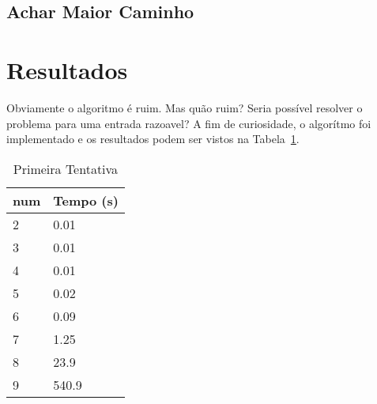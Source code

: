 \documentclass[12pt]{article}
\begin{document}
\subsection{Achar Maior Caminho}\label{sec:algoritmos:achar-maior-caminho}

\section{Resultados}\label{sec:resultados}
Obviamente o algoritmo é ruim. Mas quão ruim? Seria possível resolver o problema para uma entrada razoavel? A fim de curiosidade, o algorítmo foi implementado e os resultados podem ser vistos na Tabela~\ref{tab:resultados-1}.

\begin{table}[h]
\caption{Primeira Tentativa}
\label{tab:resultados-1}
\begin{tabular}{ll}
  {\sf num} & Tempo (s) \\
  \hline
  2 & 0.01 \\
  3 & 0.01 \\
  4 & 0.01 \\
  5 & 0.02 \\
  6 & 0.09 \\
  7 & 1.25 \\
  8 & 23.9 \\
  9 & 540.9    
\end{tabular}
\end{table}
\end{document}
